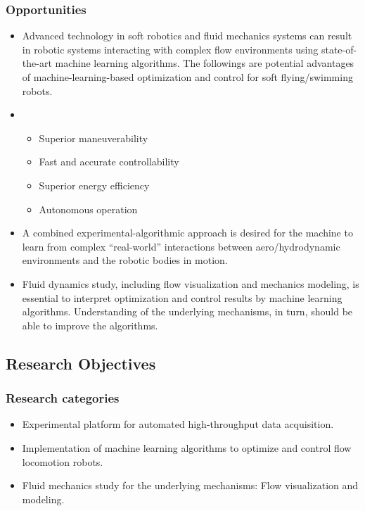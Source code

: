 \documentclass[12pt, a4paper]{article}
\providecommand{\tightlist}{%
  \setlength{\itemsep}{0pt}\setlength{\parskip}{0pt}}
\begin{document}
\hypertarget{opportunities}{%
\subsubsection{Opportunities}\label{opportunities}}

\begin{itemize}
\item
  Advanced technology in soft robotics and fluid mechanics systems can
  result in robotic systems interacting with complex flow environments
  using state-of-the-art machine learning algorithms. The followings are
  potential advantages of machine-learning-based optimization and
  control for soft flying/swimming robots.
\item
  \begin{itemize}
  \tightlist
  \item
    Superior maneuverability
  \item
    Fast and accurate controllability
  \item
    Superior energy efficiency
  \item
    Autonomous operation
  \end{itemize}
\item
  A combined experimental-algorithmic approach is desired for the
  machine to learn from complex ``real-world'' interactions between
  aero/hydrodynamic environments and the robotic bodies in motion.
\item
  Fluid dynamics study, including flow visualization and mechanics
  modeling, is essential to interpret optimization and control results
  by machine learning algorithms. Understanding of the underlying
  mechanisms, in turn, should be able to improve the algorithms.
\end{itemize}

\hypertarget{research-objectives}{%
\subsection{Research Objectives}\label{research-objectives}}

\hypertarget{research-categories}{%
\subsubsection{Research categories}\label{research-categories}}

\begin{itemize}
\tightlist
\item
  Experimental platform for automated high-throughput data acquisition.
\item
  Implementation of machine learning algorithms to optimize and control
  flow locomotion robots.
\item
  Fluid mechanics study for the underlying mechanisms: Flow
  visualization and modeling.
\end{itemize}
\end{document}
